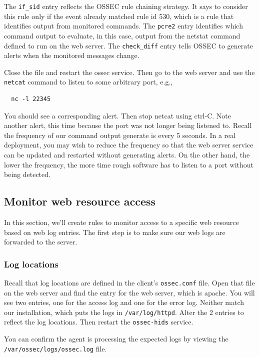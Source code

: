 The {\tt if\_sid} entry reflects the OSSEC rule chaining strategy.  It says to consider this rule only if the event
already matched rule id 530, which is a rule that identifies output from monitored commands.
The {\tt pcre2} entry identifies which command output to evaluate, in this case, output from the netstat command defined
to run on the web server.  The {\tt check\_diff} entry tells OSSEC to generate alerts when the monitored messages change.

Close the file and restart the ossec service.  Then go to the web server and use the {\tt netcat} command to listen to some
arbitrary port, e.g.,
\begin{verbatim}
  nc -l 22345
\end{verbatim}

\noindent You should see a corresponding alert.   Then stop netcat using ctrl-C.  Note another alert, this time because the 
port was not longer being listened to.  Recall the frequency of our command output generate is every 5 seconds.  In a real 
deployment, you may wish to reduce the frequency so that the web server service can be updated and restarted without 
generating alerts.  On the  other hand, the lower the frequency, the more time rough software has to listen to a port
without being detected.

\subsection{Monitor web resource access}
In this section, we'll create rules to monitor access to a specific web resource based on web log entries.  
The first step is to make sure our web logs are forwarded to the server.  

\subsubsection{Log locations}
Recall that log locations are defined
in the client's {\tt ossec.conf} file.  Open that file on the web server and find the entry for the web server,
which is apache. You will see two entries, one for the access log and one for the error log.  Neither match our
installation, which puts the logs in {\tt /var/log/httpd}.  Alter the 2 entries to reflect the log locations.
Then restart the {\tt ossec-hids} service.

You can confirm the agent is processing the expected logs by viewing the {\tt /var/ossec/logs/ossec.log} file.


